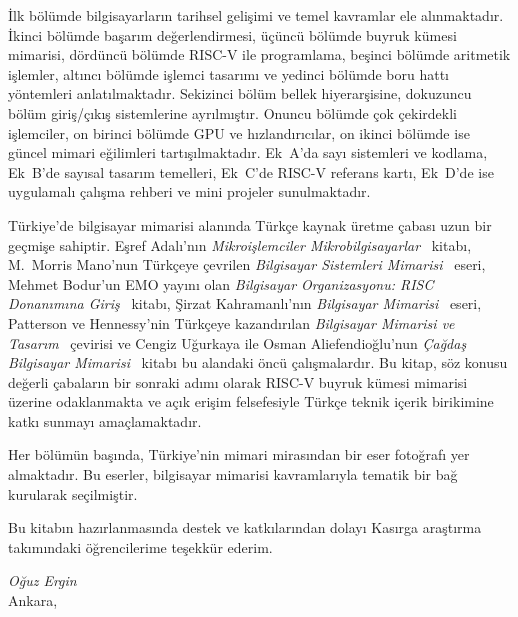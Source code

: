 \documentclass[12pt, a4paper, twoside, openright]{book}
\begin{document}
İlk bölümde bilgisayarların tarihsel gelişimi ve temel kavramlar ele alınmaktadır. İkinci bölümde başarım değerlendirmesi, üçüncü bölümde buyruk kümesi mimarisi, dördüncü bölümde RISC-V ile programlama, beşinci bölümde aritmetik işlemler, altıncı bölümde işlemci tasarımı ve yedinci bölümde boru hattı yöntemleri anlatılmaktadır. Sekizinci bölüm bellek hiyerarşisine, dokuzuncu bölüm giriş/çıkış sistemlerine ayrılmıştır. Onuncu bölümde çok çekirdekli işlemciler, on birinci bölümde GPU ve hızlandırıcılar, on ikinci bölümde ise güncel mimari eğilimleri tartışılmaktadır. Ek~A'da sayı sistemleri ve kodlama, Ek~B'de sayısal tasarım temelleri, Ek~C'de RISC-V referans kartı, Ek~D'de ise uygulamalı çalışma rehberi ve mini projeler sunulmaktadır.

Türkiye'de bilgisayar mimarisi alanında Türkçe kaynak üretme çabası uzun bir geçmişe sahiptir. Eşref Adalı'nın \emph{Mikroişlemciler Mikrobilgisayarlar}~\cite{adali} kitabı, M.~Morris Mano'nun Türkçeye çevrilen \emph{Bilgisayar Sistemleri Mimarisi}~\cite{mano2002tr} eseri, Mehmet Bodur'un EMO yayını olan \emph{Bilgisayar Organizasyonu: RISC Donanımına Giriş}~\cite{bodur2003} kitabı, Şirzat Kahramanlı'nın \emph{Bilgisayar Mimarisi}~\cite{kahramanli} eseri, Patterson ve Hennessy'nin Türkçeye kazandırılan \emph{Bilgisayar Mimarisi ve Tasarım}~\cite{patterson2021tr} çevirisi ve Cengiz Uğurkaya ile Osman Aliefendioğlu'nun \emph{Çağdaş Bilgisayar Mimarisi}~\cite{colkesen2026} kitabı bu alandaki öncü çalışmalardır. Bu kitap, söz konusu değerli çabaların bir sonraki adımı olarak RISC-V buyruk kümesi mimarisi üzerine odaklanmakta ve açık erişim felsefesiyle Türkçe teknik içerik birikimine katkı sunmayı amaçlamaktadır.

Her bölümün başında, Türkiye'nin mimari mirasından bir eser fotoğrafı yer almaktadır. Bu eserler, bilgisayar mimarisi kavramlarıyla tematik bir bağ kurularak seçilmiştir.

Bu kitabın hazırlanmasında destek ve katkılarından dolayı Kasırga araştırma takımındaki öğrencilerime teşekkür ederim.

\vspace{1cm}
\begin{flushright}
\textit{Oğuz Ergin}\\
Ankara, \the\year
\end{flushright}
\cleardoublepage

\tableofcontents
\cleardoublepage
\listoffigures
{}
\cleardoublepage
\listoftables
{}
\cleardoublepage
\listofbilginotlari
\end{document}

